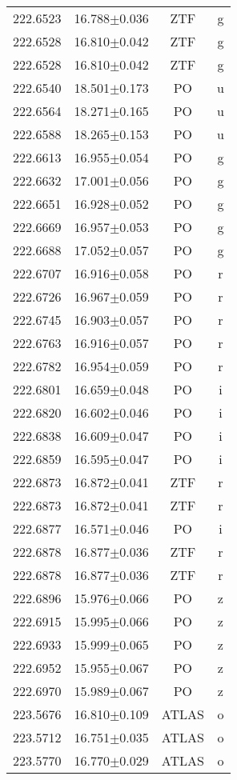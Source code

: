 \begin{table}
\begin{tabular}{cccc}
222.6523 & 16.788$\pm$0.036 & ZTF & g \\
222.6528 & 16.810$\pm$0.042 & ZTF & g \\
222.6528 & 16.810$\pm$0.042 & ZTF & g \\
222.6540 & 18.501$\pm$0.173 & PO & u \\
222.6564 & 18.271$\pm$0.165 & PO & u \\
222.6588 & 18.265$\pm$0.153 & PO & u \\
222.6613 & 16.955$\pm$0.054 & PO & g \\
222.6632 & 17.001$\pm$0.056 & PO & g \\
222.6651 & 16.928$\pm$0.052 & PO & g \\
222.6669 & 16.957$\pm$0.053 & PO & g \\
222.6688 & 17.052$\pm$0.057 & PO & g \\
222.6707 & 16.916$\pm$0.058 & PO & r \\
222.6726 & 16.967$\pm$0.059 & PO & r \\
222.6745 & 16.903$\pm$0.057 & PO & r \\
222.6763 & 16.916$\pm$0.057 & PO & r \\
222.6782 & 16.954$\pm$0.059 & PO & r \\
222.6801 & 16.659$\pm$0.048 & PO & i \\
222.6820 & 16.602$\pm$0.046 & PO & i \\
222.6838 & 16.609$\pm$0.047 & PO & i \\
222.6859 & 16.595$\pm$0.047 & PO & i \\
222.6873 & 16.872$\pm$0.041 & ZTF & r \\
222.6873 & 16.872$\pm$0.041 & ZTF & r \\
222.6877 & 16.571$\pm$0.046 & PO & i \\
222.6878 & 16.877$\pm$0.036 & ZTF & r \\
222.6878 & 16.877$\pm$0.036 & ZTF & r \\
222.6896 & 15.976$\pm$0.066 & PO & z \\
222.6915 & 15.995$\pm$0.066 & PO & z \\
222.6933 & 15.999$\pm$0.065 & PO & z \\
222.6952 & 15.955$\pm$0.067 & PO & z \\
222.6970 & 15.989$\pm$0.067 & PO & z \\
223.5676 & 16.810$\pm$0.109 & ATLAS & o \\
223.5712 & 16.751$\pm$0.035 & ATLAS & o \\
223.5770 & 16.770$\pm$0.029 & ATLAS & o \\

\end{tabular}
\end{table}
